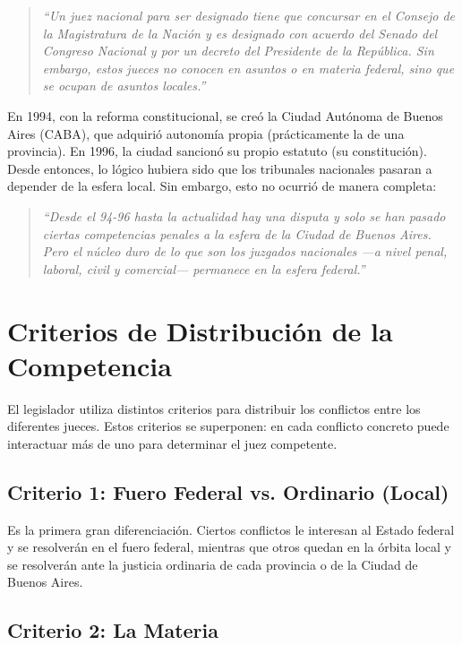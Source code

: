 \documentclass[12pt,oneside]{book}
\begin{document}
\begin{quote}
\itshape
``Un juez nacional para ser designado tiene que concursar en el Consejo de la Magistratura de la Nación y es designado con acuerdo del Senado del Congreso Nacional y por un decreto del Presidente de la República. Sin embargo, estos jueces no conocen en asuntos o en materia federal, sino que se ocupan de asuntos locales.''
\end{quote}

En 1994, con la reforma constitucional, se creó la Ciudad Autónoma de Buenos Aires (CABA), que adquirió autonomía propia (prácticamente la de una provincia). En 1996, la ciudad sancionó su propio estatuto (su constitución). Desde entonces, lo lógico hubiera sido que los tribunales nacionales pasaran a depender de la esfera local. Sin embargo, esto no ocurrió de manera completa:

\begin{quote}
\itshape
``Desde el 94-96 hasta la actualidad hay una disputa y solo se han pasado ciertas competencias penales a la esfera de la Ciudad de Buenos Aires. Pero el núcleo duro de lo que son los juzgados nacionales —a nivel penal, laboral, civil y comercial— permanece en la esfera federal.''
\end{quote}

\section{Criterios de Distribución de la Competencia}

El legislador utiliza distintos criterios para distribuir los conflictos entre los diferentes jueces. Estos criterios se superponen: en cada conflicto concreto puede interactuar más de uno para determinar el juez competente.

\subsection{Criterio 1: Fuero Federal vs. Ordinario (Local)}

Es la primera gran diferenciación. Ciertos conflictos le interesan al Estado federal y se resolverán en el fuero federal, mientras que otros quedan en la órbita local y se resolverán ante la justicia ordinaria de cada provincia o de la Ciudad de Buenos Aires.

\subsection{Criterio 2: La Materia}
\end{document}
